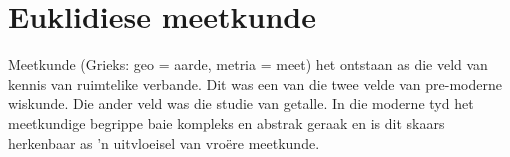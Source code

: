 \chapter{Euklidiese meetkunde}
\setcounter{figure}{1}
\setcounter{subfigure}{1}

Meetkunde (Grieks: geo = aarde, metria = meet) het ontstaan as die veld van kennis van ruimtelike verbande.
Dit was een van die twee velde van pre-moderne wiskunde. Die ander veld was die studie van getalle. In
die moderne tyd het meetkundige begrippe baie kompleks en abstrak geraak en is dit skaars herkenbaar as ’n
uitvloeisel van vroëre meetkunde.\par 




